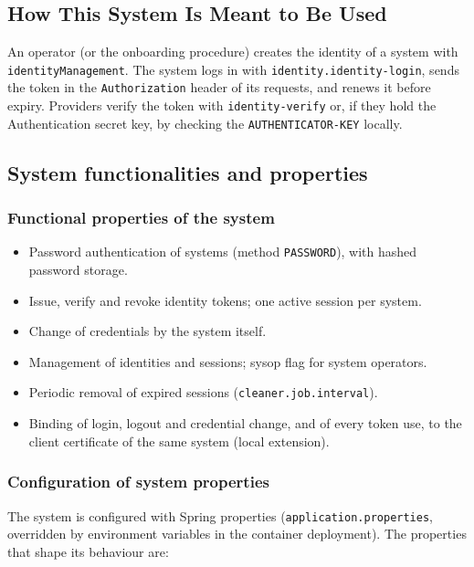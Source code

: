 \documentclass[a4paper]{arrowhead}
\begin{document}
\subsection{How This System Is Meant to Be Used}
\label{sec:use}

An operator (or the onboarding procedure) creates the identity of a system with \texttt{identityManagement}. The system logs in with \texttt{identity.\allowbreak{}identity-\allowbreak{}login}, sends the token in the \texttt{Authorization} header of its requests, and renews it before expiry. Providers verify the token with \texttt{identity-\allowbreak{}verify} or, if they hold the Authentication secret key, by checking the \texttt{AUTHENTICATOR-\allowbreak{}KEY} locally.

\subsection{System functionalities and properties}
\label{sec:properties}

\subsubsection{Functional properties of the system}

\begin{itemize}
  \item Password authentication of systems (method \texttt{PASSWORD}), with hashed password storage.
  \item Issue, verify and revoke identity tokens; one active session per system.
  \item Change of credentials by the system itself.
  \item Management of identities and sessions; sysop flag for system operators.
  \item Periodic removal of expired sessions (\texttt{cleaner.\allowbreak{}job.\allowbreak{}interval}).
  \item Binding of login, logout and credential change, and of every token use, to the client certificate of the same system (local extension).
\end{itemize}

\subsubsection{Configuration of system properties}

The system is configured with Spring properties (\texttt{application.properties}, overridden by environment variables in the container deployment). The properties that shape its behaviour are:
\end{document}
